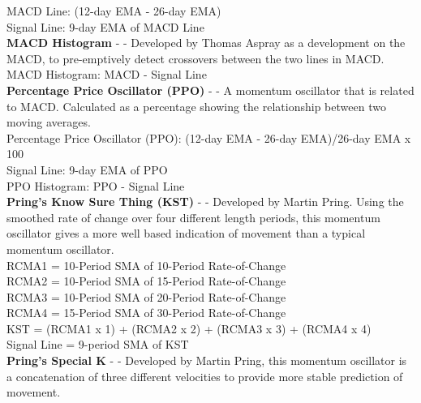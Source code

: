 \documentclass[12pt,a4paper]{article}
\begin{document}
\noindent
MACD Line: (12-day EMA - 26-day EMA)\\
Signal Line: 9-day EMA of MACD Line\\

\iffalse
[]
\fi

\noindent
\textbf{MACD Histogram} - \cite{Murphy1999} - Developed by Thomas Aspray as a development on the MACD, to pre-emptively detect crossovers between the two lines in MACD.\\

\noindent
MACD Histogram: MACD - Signal Line \\

\iffalse
[]
\fi

\noindent
\textbf{Percentage Price Oscillator (PPO)} - \cite{Murphy1999} - A momentum oscillator that is related to MACD. Calculated as a percentage showing the relationship between two moving averages. \\

\noindent
Percentage Price Oscillator (PPO): {(12-day EMA - 26-day EMA)/26-day EMA} x 100 \\
Signal Line: 9-day EMA of PPO \\
PPO Histogram: PPO - Signal Line \\

\iffalse
[]
\fi

\noindent
\textbf{Pring's Know Sure Thing (KST)} - \cite{Pring2002} - Developed by Martin Pring. Using the smoothed rate of change over four different length periods, this momentum oscillator gives a more well based indication of movement than a typical momentum oscillator. \\

\noindent
RCMA1 = 10-Period SMA of 10-Period Rate-of-Change \\
RCMA2 = 10-Period SMA of 15-Period Rate-of-Change \\
RCMA3 = 10-Period SMA of 20-Period Rate-of-Change \\
RCMA4 = 15-Period SMA of 30-Period Rate-of-Change \\
KST = (RCMA1 x 1) + (RCMA2 x 2) + (RCMA3 x 3) + (RCMA4 x 4) \\
Signal Line = 9-period SMA of KST \\

\iffalse
[]
\fi

\noindent
\textbf{Pring's Special K} - \cite{Pring2002} - Developed by Martin Pring, this momentum oscillator is a concatenation of three different velocities to provide more stable prediction of movement. \\
\end{document}
